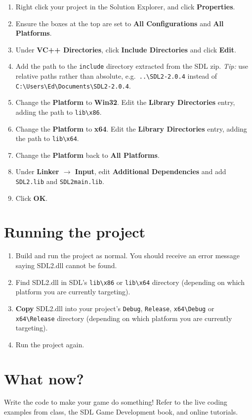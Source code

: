 \documentclass[a4paper]{article}
\begin{document}
\begin{enumerate}
    \item Right click your project in the Solution Explorer, and click \textbf{Properties}.
    \item Ensure the boxes at the top are set to \textbf{All Configurations} and \textbf{All Platforms}.
    \item Under \textbf{VC++ Directories}, click \textbf{Include Directories} and click \textbf{Edit}.
    \item Add the path to the \texttt{include} directory extracted from the SDL zip.
        \emph{Tip:} use relative paths rather than absolute, e.g.\ \verb!..\SDL2-2.0.4! instead of \verb!C:\Users\Ed\Documents\SDL2-2.0.4!.
    \item Change the \textbf{Platform} to \textbf{Win32}. Edit the \textbf{Library Directories} entry, adding the path to \verb!lib\x86!.
    \item Change the \textbf{Platform} to \textbf{x64}. Edit the \textbf{Library Directories} entry, adding the path to \verb!lib\x64!.
    \item Change the \textbf{Platform} back to \textbf{All Platforms}.
    \item Under \textbf{Linker $\to$ Input}, edit \textbf{Additional Dependencies} and add \texttt{SDL2.lib} and \texttt{SDL2main.lib}.
    \item Click \textbf{OK}.
\end{enumerate}

\section{Running the project}

\begin{enumerate}
    \item Build and run the project as normal. You should receive an error message saying SDL2.dll cannot be found.
    \item Find SDL2.dll in SDL's \verb!lib\x86! or \verb!lib\x64! directory (depending on which platform you are currently targeting).
    \item \textbf{Copy} SDL2.dll into your project's \verb!Debug!, \verb!Release!, \verb!x64\Debug! or \verb!x64\Release! directory
        (depending on which platform you are currently targeting).
    \item Run the project again.
\end{enumerate}

\section{What now?}

Write the code to make your game do something! Refer to the live coding examples from class, the SDL Game Development book, and online tutorials.
\end{document}
